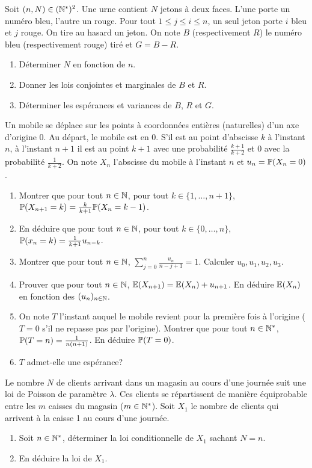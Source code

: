 \begin{exercise}
	Soit $(n,N)\in(\N^{*})^{2}$. Une urne contient $N$ jetons à deux faces. L'une
	porte un numéro bleu, l'autre un rouge. Pour tout $1\leqslant j\leqslant
	i\leqslant n$, un seul jeton porte $i$ bleu et $j$ rouge. On tire au hasard un
	jeton. On note $B$ (respectivement $R$) le numéro bleu (respectivement rouge)
	tiré et $G=B-R$.
	\begin{enumerate}
		\item
		Déterminer $N$ en fonction de $n$.
		\item
		Donner les lois conjointes et marginales de $B$ et $R$.
		\item
		Déterminer les espérances et variances de $B$, $R$ et $G$.
	\end{enumerate}
\end{exercise}

\begin{exercise}
	Un mobile se déplace sur les points à coordonnées entières (naturelles) d'un
	axe d'origine 0. Au départ, le mobile est en 0. S'il est au point d'abscisse
	$k$ à l'instant $n$, à l'instant $n+1$ il est au point $k+1$ avec une
	probabilité $\frac{k+1}{k+2}$ et 0 avec la probabilité $\frac{1}{k+2}$. On
	note $X_{n}$ l'abscisse du mobile à l'instant $n$ et $u_{n}=\P(X_{n}=0)$.
	\begin{enumerate}
		\item
		Montrer que pour tout $n\in\N$, pour tout $k\in\{1,\dots,n+1\}$,
		$\P(X_{n+1}=k)=\frac{k}{k+1}\P(X_{n}=k-1)$.
		\item
		En déduire que pour tout $n\in\N$, pour tout $k\in\{0,\dots,n\}$,
		$\P(x_{n}=k)=\frac{1}{k+1}u_{n-k}$.
		\item
		Montrer que pour tout $n\in\N$, $\sum_{j=0}^{n}\frac{u_{n}}{n-j+1}=1$.
		Calculer $u_{0},u_{1},u_{2},u_{3}$.
		\item
		Prouver que pour tout $n\in\N$, $\E(X_{n+1})=\E(X_{n})+u_{n+1}$. En
		déduire $\E(X_{n})$ en fonction des $(u_{n})_{n\in\N}$.
		\item
		On note $T$ l'instant auquel le mobile revient pour la première fois à
		l'origine ($T=0$ s'il ne repasse pas par l'origine). Montrer que pour tout
		$n\in\N^{*}$, $\P(T=n)=\frac{1}{n(n+1)}$. En déduire $\P(T=0)$.
		\item
		$T$ admet-elle une espérance?
	\end{enumerate}
\end{exercise}

\begin{exercise}
	Le nombre $N$ de clients arrivant dans un magasin au cours d'une journée suit
	une loi de Poisson de paramètre $\lambda$. Ces clients se répartissent de
	manière équiprobable entre les $m$ caisses du magasin ($m\in\N^{*}$). Soit
	$X_{1}$ le nombre de clients qui arrivent à la caisse 1 au cours d'une
	journée. 
	\begin{enumerate}
		\item
		Soit $n\in\N^{*}$, déterminer la loi conditionnelle de $X_{1}$ sachant
		$N=n$.
		\item
		En déduire la loi de $X_{1}$.
	\end{enumerate}
\end{exercise}

